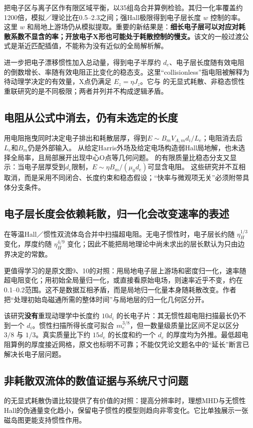 \citet{Simakov2009}把电子区与离子区作有限区域平衡，以35组岛合并算例检验。其归一化率覆盖约1200倍，模拟／理论比在0.5--2.3之间；强Hall极限得到电子层长度 $w$ 控制的率。这里 $w$ 和局地上游场仍从模拟提取。重要的新结果是：\textbf{细长电子层可以对应对耗散系数不显含的率；开放电子X形也可能处于耗散控制的慢支。}该文的一般过渡公式是渐近匹配插值，不能称为没有近似的全局解析解。

\citet{Malyshkin2009}进一步把电子漂移惯性加入总动量，得到电子半厚约 $d_e$、电子层长度随有效电阻的倒数增长、率随有效电阻正比变化的稳态支。这里“collisionless”指电阻被解释为待动理学决定的有效量，X点仍满足 $E_z=\eta J_z$。它与 \citet{Andres2014} 的无显式耗散、非稳态惯性重联研究的是不同极限；两者并列并不构成逻辑矛盾。

\subsection{电阻从公式中消去，仍有未选定的长度}
\citet{L145}用电阻拖曳同时决定电子排出和耗散层厚，得到$E\sim B_mV_{\!A,m}d_i/L_e$；电阻消去后$L_e$和$B_m$仍是外部输入。
\citet{L137}从给定Harris外场及给定电场构造弱Hall局地解，也未选择全局率，且局部展开出现中心O点等几何问题。
\citet{L160}的有限质量比稳态分支又显示：当电子层厚受到$d_e$限制，$E\sim\eta B_m/(\mu_0d_e)$可显含电阻。
这些研究并不互相取消，而是采用不同闭合、长度约束和稳态假设；“快率与微观项无关”必须附带具体分支条件。

\subsection{电子层长度会依赖耗散，归一化会改变速率的表述}
\citet{Sullivan2009}在等温Hall／惯性双流体岛合并中扫描超电阻。无电子惯性时，电子层长约随 $\eta_H^{1/3}$ 变化，厚度约随 $\eta_H^{4/9}$ 变化；因此不能把局地理论中尚未求出的层长默认为只由边界决定的常数。

更值得学习的是原文图9、10的对照：用局地电子层上游场和密度归一化，速率随超电阻变化；用初始全局量归一化，或直接看原始电场，则速率近乎不变，约在0.1--0.2范围。这不是数据互相矛盾，而是局地归一化量本身随耗散改变。作者把“处理初始岛磁通所需的整体时间”与局地层的归一化几何区分开。

该研究\textbf{没有}重现动理学中长度约 $10d_i$ 的长电子片：其无惯性超电阻扫描最长仍不到一个 $d_i$。惯性扫描所得长度可拟合 $m_e^{3/8}$，但一数量级质量比区间不足以区分 $3/8$ 与 $1/3$。真实质量比下约 $15d_e$ 的长度和约一个 $d_e$ 的厚度均为外推。最低超电阻算例的厚度接近网格，原文也标明不可靠；不能仅凭论文题名中的“延长”断言已解决长电子层问题。

\subsection{非耗散双流体的数值证据与系统尺寸问题}
\citet{Andres2014}的无显式耗散伪谱比较提供了有价值的对照：提高分辨率时，理想MHD与无惯性Hall的伪通量变化趋小，保留电子惯性的模型则趋向非零变化。它比单独展示一张磁岛图更能支持惯性作用。


